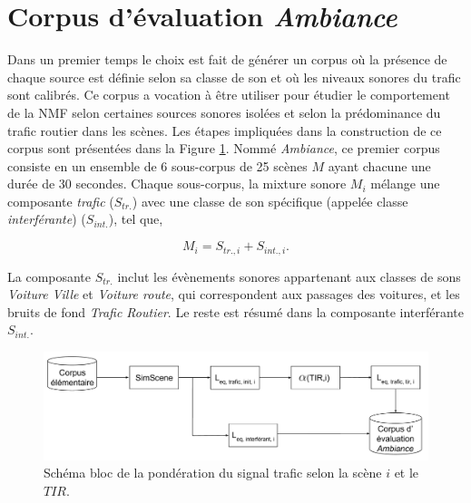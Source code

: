 \section{Corpus d'évaluation \textit{Ambiance}}
\label{part:corpus_ambiance}
Dans un premier temps le choix est fait de générer un corpus où la présence de chaque source est définie selon sa classe de son et où les niveaux sonores du trafic sont calibrés. Ce corpus a vocation à être utiliser pour étudier le comportement de la NMF selon certaines sources sonores isolées et selon la prédominance du trafic routier dans les scènes. Les étapes impliquées dans la construction de ce corpus sont présentées dans la Figure \ref{fig:bloc_diagram_tir}. Nommé \textit{Ambiance}, ce premier corpus consiste en un ensemble de 6 sous-corpus de 25 scènes $M$ ayant chacune une durée de 30 secondes. Chaque sous-corpus, la mixture sonore $M_i$ mélange une composante \textit{trafic} ($S_{tr.}$) avec une classe de son spécifique (appelée classe \textit{interférante}) ($S_{int.}$), tel que,  

\begin{equation}
M_i = S_{tr.,i}+S_{int.,i}.
\end{equation}

La composante $S_{tr.}$ inclut les évènements sonores appartenant aux classes de sons \textit{Voiture Ville} et \textit{Voiture route}, qui correspondent aux passages des voitures, et les bruits de fond \textit{Trafic Routier}. Le reste est résumé dans la composante interférante $S_{int.}$.

\begin{figure}[ht]
\centering
\includegraphics[width=.9\linewidth]{./figures/autres/TIR_ambiance.pdf}
\caption{Schéma bloc de la pondération du signal trafic selon la scène $i$ et le $TIR$.}
\label{fig:bloc_diagram_tir}
\end{figure}


